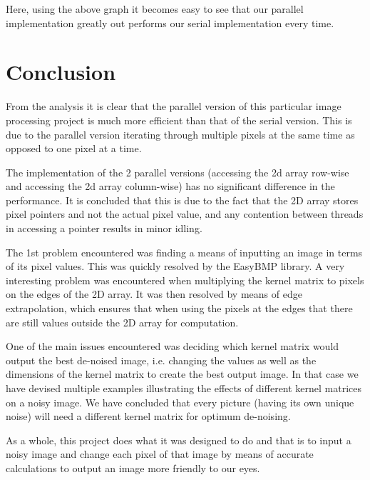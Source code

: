 \documentclass[paper=a4, fontsize=11pt]{scrartcl} %
\numberwithin{equation}{section} %
\numberwithin{figure}{section} %
\numberwithin{table}{section} %
\begin{document}
Here, using the above graph it becomes easy to see that our parallel implementation greatly out performs our serial implementation every time.

\section{Conclusion}
From the analysis it is clear that the parallel version of this particular image processing project is much more efficient than that of the serial version. This is due to the parallel version iterating through multiple pixels at the same time as opposed to one pixel at a time.


The implementation of the 2 parallel versions (accessing the 2d array row-wise and accessing the 2d array column-wise) has no significant difference in the performance. It is concluded that this is due to the fact that the 2D array stores pixel pointers and not the actual pixel value, and any contention between threads in accessing a pointer results in minor idling.


The 1st problem encountered was finding a means of inputting an image in terms of its pixel values. This was quickly resolved by the EasyBMP library.
A very interesting problem was encountered when multiplying the kernel matrix to pixels on the edges of the 2D array. It was then resolved by means of edge extrapolation, which ensures that when using the pixels at the edges that there are still values outside the 2D array for computation.


One of the main issues encountered was deciding which kernel matrix would output the best de-noised image, i.e. changing the values as well as the dimensions of the kernel matrix to create the best output image. In that case we have devised multiple examples illustrating the effects of different kernel matrices on a noisy image. We have concluded that every picture (having its own unique noise) will need a different kernel matrix for optimum de-noising.


As a whole, this project does what it was designed to do and that is to input a noisy image and change each pixel of that image by means of accurate calculations to output an image more friendly to our eyes.
\end{document}
